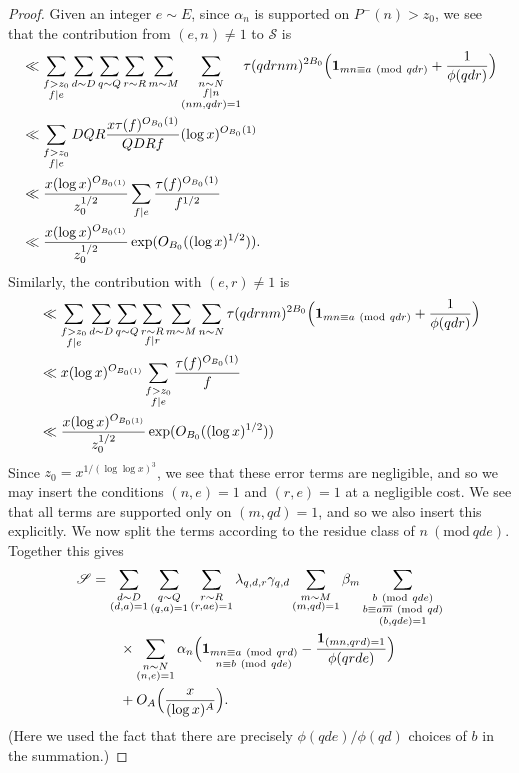 \documentclass[10pt]{amsart}
\theoremstyle{plain}
\numberwithin{equation}{section}
\newcommand{\Mod}[1]{\ (\mathrm{mod}\ #1)}
\begin{document}
\begin{proof}
Given an integer $e\sim E$, since $\alpha_n$ is supported on $P^-(n)>z_0$, we see that the contribution from $(e,n)\ne 1$ to $\mathscr{S}$ is 
\begin{align*}
&\ll \sum_{\substack{f>z_0\\ f|e}}\sum_{d\sim D}\sum_{q\sim Q}\sum_{r\sim R}\sum_{m\sim M}\sum_{\substack{n\sim N\\ f|n\\ (n m,q d r)=1}}\tau(q d r n m)^{2B_0}\Bigl(\mathbf{1}_{m n\equiv a\Mod{q d r}}+\frac{1}{\phi(q d r)}\Bigr)\\
&\ll  \sum_{\substack{f>z_0\\ f|e}}D Q R \frac{x \tau(f)^{O_{B_0}(1)}}{Q D R f}(\log{x})^{O_{B_0}(1)}\\
&\ll \frac{x(\log{x})^{O_{B_0(1)}}}{z_0^{1/2}}\sum_{f|e}\frac{\tau(f)^{O_{B_0}(1)}}{f^{1/2}}\\
&\ll \frac{x(\log{x})^{O_{B_0(1)}}}{z_0^{1/2}}\exp(O_{B_0}((\log{x})^{1/2})).
\end{align*}
Similarly, the contribution with $(e,r)\ne 1$ is
\begin{align*}
&\ll \sum_{\substack{f>z_0\\ f|e}}\sum_{d\sim D}\sum_{q\sim Q}\sum_{\substack{r\sim R\\ f|r}}\sum_{m\sim M}\sum_{\substack{n\sim N}}\tau(q d r n m)^{2B_0}\Bigl(\mathbf{1}_{mn\equiv a\Mod{qdr}}+\frac{1}{\phi(qdr)}\Bigr)\\
&\ll x(\log{x})^{O_{B_0(1)}}\sum_{\substack{f>z_0\\ f|e}}\frac{\tau(f)^{O_{B_0}(1)}}{f}\\
&\ll \frac{x(\log{x})^{O_{B_0(1)}}}{z_0^{1/2}}\exp(O_{B_0}((\log{x})^{1/2}))
\end{align*}
Since $z_0=x^{1/(\log\log{x})^3}$, we see that these error terms are negligible, and so we may insert the conditions $(n,e)=1$ and $(r,e)=1$ at a negligible cost. We see that all terms are supported only on $(m,q d)=1$, and so we also insert this explicitly. We now split the terms according to the residue class of $n\Mod{qde}$. Together this gives
\begin{align*}
\mathscr{S}&=\sum_{\substack{d\sim D\\ (d,a)=1}}\sum_{\substack{q\sim Q\\ (q,a)=1}}\sum_{\substack{r\sim R\\ (r,a e)=1}}\lambda_{q,d,r}\gamma_{q,d}\sum_{\substack{m\sim M\\ (m,q d)=1}}\beta_m\sum_{\substack{b\Mod{q d e}\\ b\equiv a\overline{m}\Mod{q d}\\ (b,q d e )=1}}\\
&\qquad \times\sum_{\substack{n\sim N\\ (n,e)=1}}\alpha_n\Bigl(\mathbf{1}_{\substack{m n\equiv a\Mod{q r d}\\ n\equiv b\Mod{q d e}}}-\frac{\mathbf{1}_{(m n,q r d)=1}}{\phi(q r d e)}\Bigr)\\
&\qquad+O_A\Bigl(\frac{x}{(\log{x})^A}\Bigr).
\end{align*}
(Here we used the fact that there are precisely $\phi(q d e)/\phi(q d)$ choices of $b$ in the summation.)


\end{proof}
\end{document}
